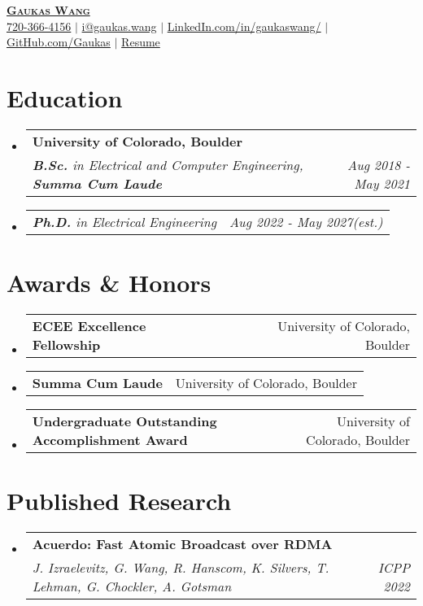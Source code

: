 \documentclass[letterpaper,11pt]{article}
\makeatletter
\newcommand{\resumeSubheading}[4]{
  \vspace{-2pt}\item
    \begin{tabular*}{0.97\textwidth}[t]{l@{\extracolsep{\fill}}r}
      \textbf{#1} & #2 \\
      \textit{\small#3} & \textit{\small #4} \\
    \end{tabular*}\vspace{-7pt}
}
\newcommand{\resumeSubSubheading}[2]{
    \item
    \begin{tabular*}{0.97\textwidth}{l@{\extracolsep{\fill}}r}
      \textit{\small#1} & \textit{\small #2} \\
    \end{tabular*}\vspace{-7pt}
}
\newcommand{\resumeProjectHeading}[2]{
    \item
    \begin{tabular*}{0.97\textwidth}{l@{\extracolsep{\fill}}r}
      \small#1 & #2 \\
    \end{tabular*}\vspace{-7pt}
}
\newcommand{\resumeSubHeadingListStart}{\begin{itemize}[leftmargin=0.15in, label={}]}
\newcommand{\resumeSubHeadingListEnd}{\end{itemize}}
\makeatother
\begin{document}
\begin{center}
  \href{https://gaukas.wang}{\textbf{\Huge \scshape Gaukas Wang}} \\ \vspace{1pt}
    \href{tel:720-366-4156}{{720-366-4156}} $|$
    \href{mailto:i@gaukas.wang}{{i@gaukas.wang}} $|$ 
    \href{https://www.linkedin.com/in/gaukaswang/}{{LinkedIn.com/in/gaukaswang/}} $|$
    \href{https://github.com/Gaukas}{{GitHub.com/Gaukas}} $|$ 
    \href{https://gauk.as/resume}{{Resume}}
    
\end{center}


\section{Education}
\resumeSubHeadingListStart
  \resumeSubheading
    {University of Colorado, Boulder}{}
    {\textbf{B.Sc.} in Electrical and Computer Engineering, \textbf{Summa Cum Laude}}{Aug 2018 - May 2021}
  \resumeSubSubheading
    {\textbf{Ph.D.} in Electrical Engineering}{Aug 2022 - May 2027\textit{(est.)}}
  \resumeSubHeadingListEnd

\section{Awards \& Honors}
  \resumeSubHeadingListStart
    \resumeProjectHeading 
      {\textbf{ECEE Excellence Fellowship}}{University of Colorado, Boulder}
    \resumeProjectHeading
      {\textbf{Summa Cum Laude}}{University of Colorado, Boulder}
    \resumeProjectHeading
      {\textbf{Undergraduate Outstanding Accomplishment Award}}{University of Colorado, Boulder}
  \resumeSubHeadingListEnd

  \vspace{1pt}

\section{Published Research}
  \resumeSubHeadingListStart
    \resumeSubheading
      {\textbf{Acuerdo: Fast Atomic Broadcast over RDMA}}{}
      {\emph{J. Izraelevitz, G. Wang, R. Hanscom, K. Silvers, T. Lehman, G. Chockler, A. Gotsman} }{ICPP 2022}
  \resumeSubHeadingListEnd
\end{document}
